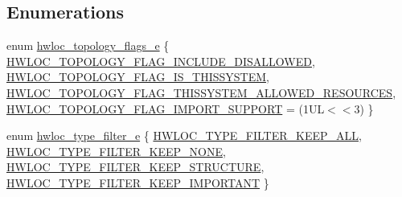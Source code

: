 \subsection*{Enumerations}
\begin{DoxyCompactItemize}
\item 
enum \hyperlink{a00193_gada025d3ec20b4b420f8038d23d6e7bde}{hwloc\+\_\+topology\+\_\+flags\+\_\+e} \{ \hyperlink{a00193_ggada025d3ec20b4b420f8038d23d6e7bdea10907044bbb306fd0dc76acf046d9258}{H\+W\+L\+O\+C\+\_\+\+T\+O\+P\+O\+L\+O\+G\+Y\+\_\+\+F\+L\+A\+G\+\_\+\+I\+N\+C\+L\+U\+D\+E\+\_\+\+D\+I\+S\+A\+L\+L\+O\+W\+ED}, 
\hyperlink{a00193_ggada025d3ec20b4b420f8038d23d6e7bdea6ecb6abc6a0bb75e81564f8bca85783b}{H\+W\+L\+O\+C\+\_\+\+T\+O\+P\+O\+L\+O\+G\+Y\+\_\+\+F\+L\+A\+G\+\_\+\+I\+S\+\_\+\+T\+H\+I\+S\+S\+Y\+S\+T\+EM}, 
\hyperlink{a00193_ggada025d3ec20b4b420f8038d23d6e7bdea1b66bbd66e900e5c837f71defb32ad89}{H\+W\+L\+O\+C\+\_\+\+T\+O\+P\+O\+L\+O\+G\+Y\+\_\+\+F\+L\+A\+G\+\_\+\+T\+H\+I\+S\+S\+Y\+S\+T\+E\+M\+\_\+\+A\+L\+L\+O\+W\+E\+D\+\_\+\+R\+E\+S\+O\+U\+R\+C\+ES}, 
\hyperlink{a00193_ggada025d3ec20b4b420f8038d23d6e7bdead93e82b8668ee90e4f9354e201a2ed9c}{H\+W\+L\+O\+C\+\_\+\+T\+O\+P\+O\+L\+O\+G\+Y\+\_\+\+F\+L\+A\+G\+\_\+\+I\+M\+P\+O\+R\+T\+\_\+\+S\+U\+P\+P\+O\+RT} = (1\+UL$<$$<$3)
 \}
\item 
enum \hyperlink{a00193_ga9a5a1f0140cd1952544477833733195b}{hwloc\+\_\+type\+\_\+filter\+\_\+e} \{ \hyperlink{a00193_gga9a5a1f0140cd1952544477833733195bafda7b59e6810dfe778d8f9a4cc1e350e}{H\+W\+L\+O\+C\+\_\+\+T\+Y\+P\+E\+\_\+\+F\+I\+L\+T\+E\+R\+\_\+\+K\+E\+E\+P\+\_\+\+A\+LL}, 
\hyperlink{a00193_gga9a5a1f0140cd1952544477833733195ba4f835955414de92c77d99b8419d4647a}{H\+W\+L\+O\+C\+\_\+\+T\+Y\+P\+E\+\_\+\+F\+I\+L\+T\+E\+R\+\_\+\+K\+E\+E\+P\+\_\+\+N\+O\+NE}, 
\hyperlink{a00193_gga9a5a1f0140cd1952544477833733195ba7664716643bf1db83e631eed34f659e4}{H\+W\+L\+O\+C\+\_\+\+T\+Y\+P\+E\+\_\+\+F\+I\+L\+T\+E\+R\+\_\+\+K\+E\+E\+P\+\_\+\+S\+T\+R\+U\+C\+T\+U\+RE}, 
\hyperlink{a00193_gga9a5a1f0140cd1952544477833733195ba63fd24954e18c83ff7eae9588759adb5}{H\+W\+L\+O\+C\+\_\+\+T\+Y\+P\+E\+\_\+\+F\+I\+L\+T\+E\+R\+\_\+\+K\+E\+E\+P\+\_\+\+I\+M\+P\+O\+R\+T\+A\+NT}
 \}
\end{DoxyCompactItemize}
